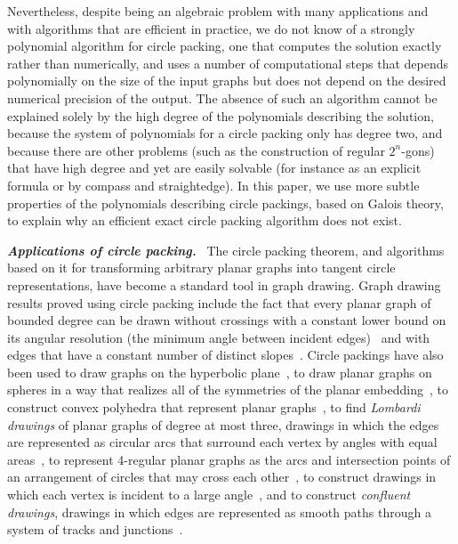 \documentclass[oribibl,10pt]{llncs}
\newcommand{\Emph}[1]{\smallskip\textbf{\textit{#1}}~}
\begin{document}
\begin{appendix}
Nevertheless, despite being an algebraic problem with many applications and with algorithms that are efficient in practice, we do not know of a strongly polynomial algorithm for circle packing, one that computes the solution exactly rather than numerically, and uses a number of computational steps that depends polynomially on the size of the input graphs but does not depend on the desired numerical precision of the output. The absence of such an algorithm cannot be explained solely by the high degree of the polynomials describing the solution, because the system of polynomials for a circle packing only has degree two, and because there are other problems (such as the construction of regular $2^n$-gons) that  have high degree and yet are easily solvable (for instance as an explicit formula or by compass and straightedge). In this paper, we use more subtle properties of the polynomials describing circle packings, based on Galois theory, to explain why an efficient exact circle packing algorithm does not exist.

\Emph{Applications of circle packing.}
The circle packing theorem, and algorithms based on it for transforming arbitrary planar graphs into tangent circle representations, have become a standard tool in graph drawing. Graph drawing results proved using circle packing include the fact that every planar graph of bounded degree can be drawn without crossings with a constant lower bound on its angular resolution (the minimum angle between incident edges)~ and with edges that have a constant number of distinct slopes~. Circle packings have also been used to draw graphs on the hyperbolic plane~, to draw planar graphs on spheres in a way that realizes all of the symmetries of the planar embedding~, to construct convex polyhedra that represent planar graphs~,  to find \emph{Lombardi drawings} of planar graphs of degree at most three, drawings in which the edges are represented as circular arcs that surround each vertex by angles with equal areas~, to represent 4-regular planar graphs as the arcs and intersection points of an arrangement of circles that may cross each other~, to construct drawings in which each vertex is incident to a large angle~, and to construct \emph{confluent drawings}, drawings in which edges are represented as smooth paths through a system of tracks and junctions~.


\end{appendix}
\end{document}
